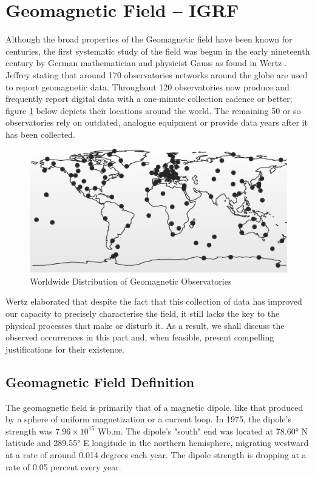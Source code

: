 \section{Geomagnetic Field -- IGRF}
Although the broad properties of the Geomagnetic field have been known for centuries, the first systematic study of the field was begun in the early nineteenth century by German mathematician and physicist Gauss as found in Wertz \cite{wertz2012spacecraft}. Jeffrey \cite{love2008magnetic} stating that around 170 observatories networks around the globe are used to report geomagnetic data. Throughout 120 observatories now produce and frequently report digital data with a one-minute collection cadence or better; figure \ref{fig:obs} below depicts their locations around the world. The remaining 50 or so observatories rely on outdated, analogue equipment or provide data years after it has been collected.

\begin{figure}[H]
    \centering
    \includegraphics[width = \textwidth]{Figures/obseratories.jpg}
    \caption{Worldwide Distribution of Geomagnetic Observatories}
    \label{fig:obs}
\end{figure}


Wertz \cite{wertz2012spacecraft} elaborated that despite the fact that this collection of data has improved our capacity to precisely characterise the field, it still lacks the key to the physical processes that make or disturb it. As a result, we shall discuss the observed occurrences in this part and, when feasible, present compelling justifications for their existence.


\subsection{Geomagnetic Field Definition}
The geomagnetic field is primarily that of a magnetic dipole, like that produced by a sphere of uniform magnetization or a current loop. In 1975, the dipole's strength was $7.96 \times 10^{15}$ Wb.m. The dipole's "south" end was located at 78.60° N latitude and 289.55° E longitude in the northern hemisphere, migrating westward at a rate of around 0.014 degrees each year. The dipole strength is dropping at a rate of 0.05 percent every year.

